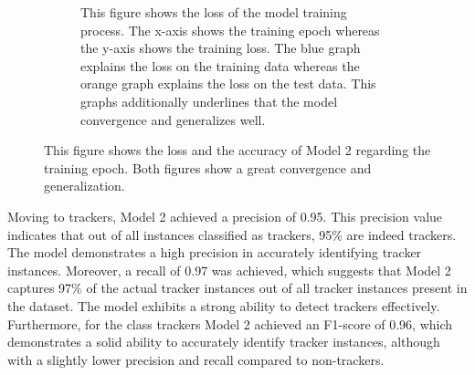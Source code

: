 \begin{figure}[ht!]
\begin{subfigure}[b]{.47\textwidth}
      \caption{This figure shows the loss of the model training process. The x-axis shows the training epoch whereas the y-axis shows
      the training loss. The blue graph explains the loss on the training data whereas the orange graph explains the loss on the test data. 
      This graphs additionally underlines that the model convergence and generalizes well.
    }
      \label{fig:lossM2}
  \end{subfigure}
  \caption{This figure shows the loss and the accuracy of Model 2 regarding the training epoch. Both figures show a great convergence and generalization.}
  \label{fig:lossaccM2}
\end{figure}
Moving to trackers, Model 2 achieved a precision of 0.95. This precision value indicates that out of all instances
classified as trackers, 95\% are indeed trackers. The model demonstrates a high precision in accurately identifying tracker instances.
Moreover, a recall of 0.97 was achieved, which suggests that Model 2 captures 97\% of the actual tracker instances
out of all tracker instances present in the dataset. The model exhibits a strong ability to detect trackers effectively.
Furthermore, for the class trackers Model 2 achieved an F1-score of 0.96, which demonstrates a solid ability to accurately
identify tracker instances, although with a slightly lower precision and recall compared to non-trackers.

